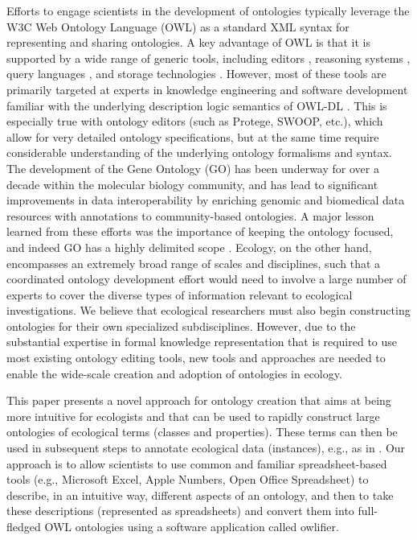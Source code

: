 \documentclass[5p,authoryear]{elsarticle}
\newcommand{\owlifier}{\textsf{owlifier}}
\begin{document}
Efforts to engage scientists in the development of ontologies
typically leverage the W3C Web Ontology Language (OWL)
\citep{smith04:_owl_web_ontol_languag_guide} as a standard XML syntax
for representing and sharing ontologies. A key advantage of OWL is
that it is supported by a wide range of generic tools, including
editors
\citep{knublauch04:_editin_descr_logic_ontol_with,kalyanpur05:_swoop},
reasoning systems
\citep{sirin07:_pellet,tsarkov06:_fact_descr_logic_reason}, query
languages
\citep{prudhommeaux08:_sparq_query_languag_for_rdf,motik05:_query_answer_for_owl_dl_with_rules},
and storage technologies
\citep{carroll04:_jena,broekstra02:_sesam}. However, most of these
tools are primarily targeted at experts in knowledge engineering and
software development familiar with the underlying description logic
semantics of OWL-DL \citep{grau08:_owl}. This is especially true with
ontology editors (such as Protege, SWOOP, etc.), which allow for very
detailed ontology specifications, but at the same time require
considerable understanding of the underlying ontology formalisms and
syntax.  The development of the Gene Ontology (GO) has been underway
for over a decade within the molecular biology community, and has lead
to significant improvements in data interoperability by enriching
genomic and biomedical data resources with annotations to
community-based ontologies. A major lesson learned from these efforts
was the importance of keeping the ontology focused, and indeed GO has
a highly delimited scope
\citep{bada04:_short_study_succes_of_gene_ontol}. Ecology, on the
other hand, encompasses an extremely broad range of scales and
disciplines, such that a coordinated ontology development effort would
need to involve a large number of experts to cover the diverse types
of information relevant to ecological investigations.  We believe that
ecological researchers must also begin constructing ontologies for
their own specialized subdisciplines. However, due to the substantial
expertise in formal knowledge representation that is required to use
most existing ontology editing tools, new tools and approaches are
needed to enable the wide-scale creation and adoption of ontologies in
ecology.

This paper presents a novel approach for ontology creation that aims
at being more intuitive for ecologists and that can be used to rapidly
construct large ontologies of ecological terms (classes and
properties). These terms can then be used in subsequent steps to
annotate ecological data (instances), e.g., as in
\citep{bowers08:_concep_model_framew_for_expres,berkley09:_improv_data_discov_metad_repos_seman_searc}.
Our approach is to allow scientists to use common and familiar
spreadsheet-based tools (e.g., Microsoft Excel, Apple Numbers, Open
Office Spreadsheet) to describe, in an intuitive way, different
aspects of an ontology, and then to take these descriptions
(represented as spreadsheets) and convert them into full-fledged OWL
ontologies using a software application called \owlifier.
\end{document}
